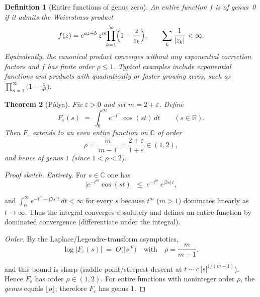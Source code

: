 \documentclass[11pt]{article}
\theoremstyle{breakdef}
\newtheorem{theorem}{Theorem}[section]
\newtheorem{definition}[theorem]{Definition}
\begin{document}
\begin{definition}[Entire functions of genus zero]\label{def:genus0}
An entire function $f$ is of \emph{genus~0} if it admits the Weierstrass product
\begin{equation}
f(z)=e^{a z + b}\,z^{m}\!\!\prod_{k=1}^{\infty}\Bigl(1-\frac{z}{z_k}\Bigr),
\qquad
\sum_{k}\frac{1}{|z_k|}<\infty.
\end{equation}
Equivalently, the canonical product converges without any exponential
correction factors and $f$ has finite order $\rho\le1$.
Typical examples include exponential functions and products with
quadratically or faster growing zeros, such as
$\displaystyle \prod_{n=1}^{\infty}\!\!\bigl(1-\frac{z}{n^2}\bigr)$.
\end{definition}
\begin{theorem}[Pólya]\label{thm:polya-genus1}
Fix $\varepsilon>0$ and set $m=2+\varepsilon$. Define
\begin{equation}
F_\varepsilon(s)\;=\;\int_{0}^{\infty} e^{-t^{m}}\cos(st)\,dt
\qquad (s\in\mathbb{R}).
\end{equation}
Then $F_\varepsilon$ extends to an even entire function on $\mathbb{C}$ of order
\begin{equation}
\rho=\frac{m}{\,m-1\,}=\frac{2+\varepsilon}{1+\varepsilon}\in(1,2),
\end{equation}
and hence of \emph{genus} $1$ (since $1<\rho<2$).
\end{theorem}

\begin{proof}[Proof sketch]
\emph{Entirety.} For $s\in\mathbb{C}$ one has
\begin{equation}
\bigl|e^{-t^{m}}\cos(st)\bigr|\;\le\;e^{-t^{m}}\,e^{|\Im s|\,t},
\end{equation}

and $\int_{0}^{\infty} e^{-t^{m}+|\Im s|\,t}\,dt<\infty$ for every $s$ because $t^{m}$ ($m>1$)
dominates linearly as $t\to\infty$. Thus the integral converges absolutely and defines an entire function by dominated convergence (differentiate under the integral).

\emph{Order.} By the Laplace/Legendre-transform asymptotics,
\begin{equation}
\log |F_\varepsilon(s)| \;=\; O\!\bigl(|s|^{\rho}\bigr)
\quad\text{with}\quad
\rho=\frac{m}{m-1},
\end{equation}

and this bound is sharp (saddle-point/steepest-descent at $t\sim c\,|s|^{1/(m-1)}$). Hence $F_\varepsilon$ has order $\rho\in(1,2)$. For entire functions with noninteger order $\rho$, the \emph{genus} equals $\lfloor \rho\rfloor$; therefore $F_\varepsilon$ has genus $1$.
\end{proof}
\end{document}
